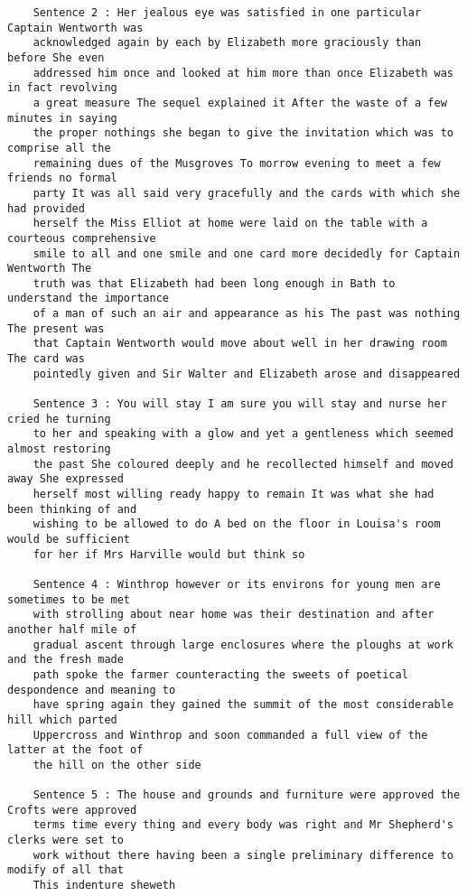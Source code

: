 \documentclass[11pt, a4paper]{article}
\begin{document}
\begin{enumerate}
\begin{verbatim}
	Sentence 2 : Her jealous eye was satisfied in one particular Captain Wentworth was 
	acknowledged again by each by Elizabeth more graciously than before She even 
	addressed him once and looked at him more than once Elizabeth was in fact revolving 
	a great measure The sequel explained it After the waste of a few minutes in saying 
	the proper nothings she began to give the invitation which was to comprise all the 
	remaining dues of the Musgroves To morrow evening to meet a few friends no formal 
	party It was all said very gracefully and the cards with which she had provided 
	herself the Miss Elliot at home were laid on the table with a courteous comprehensive 
	smile to all and one smile and one card more decidedly for Captain Wentworth The 
	truth was that Elizabeth had been long enough in Bath to understand the importance 
	of a man of such an air and appearance as his The past was nothing The present was 
	that Captain Wentworth would move about well in her drawing room The card was 
	pointedly given and Sir Walter and Elizabeth arose and disappeared
	
	Sentence 3 : You will stay I am sure you will stay and nurse her cried he turning 
	to her and speaking with a glow and yet a gentleness which seemed almost restoring 
	the past She coloured deeply and he recollected himself and moved away She expressed 
	herself most willing ready happy to remain It was what she had been thinking of and 
	wishing to be allowed to do A bed on the floor in Louisa's room would be sufficient 
	for her if Mrs Harville would but think so
	
	Sentence 4 : Winthrop however or its environs for young men are sometimes to be met 
	with strolling about near home was their destination and after another half mile of 
	gradual ascent through large enclosures where the ploughs at work and the fresh made 
	path spoke the farmer counteracting the sweets of poetical despondence and meaning to 
	have spring again they gained the summit of the most considerable hill which parted 
	Uppercross and Winthrop and soon commanded a full view of the latter at the foot of 
	the hill on the other side
	
	Sentence 5 : The house and grounds and furniture were approved the Crofts were approved 
	terms time every thing and every body was right and Mr Shepherd's clerks were set to 
	work without there having been a single preliminary difference to modify of all that 
	This indenture sheweth
	\end{verbatim}
	

\end{enumerate}
\end{document}
